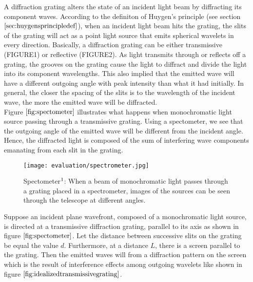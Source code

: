 A diffraction grating alters the state of an incident light beam by diffracting its component waves. According to the definiton of Huygen's principle (see section $\ref{sec:huygensprincipledef}$), when an incident light beam hits the grating, the slits of the grating will act as a point light source that emits spherical wavelets in every direction. Basically, a diffraction grating can be either transmissive (FIGURE1) or reflective (FIGURE2). As light transmits through or reflects off a grating, the grooves on the grating cause the light to diffract and divide the light into its component wavelengths. This also implied that the emitted wave will have a different outgoing angle with peak intensity than what it had initially. In general, the closer the spacing of the slits is to the wavelength of the incident wave, the more the emitted wave will be diffracted. \\

Figure $\ref{fig:spectometer}$ illustrates what happens when monochromatic light source passing through a transmissive grating. Using a spectometer, we see that the outgoing angle of the emitted wave will be different from the incident angle. Hence, the diffracted light is composed of the sum of interfering wave components emanating from each slit in the grating.

\begin{figure}[H]
  \centering
  \texttt{[image: evaluation/spectrometer.jpg]}
  \caption[Spectometer]{Spectometer$\footnotemark$: When a beam of monochromatic light passes through a grating placed in a spectrometer, images of the sources can be seen through the telescope at different angles.}
\label{fig:spectometer}
\end{figure}


Suppose an incident plane wavefront, composed of a monochromatic light source, is directed at a transmissive diffraction grating, parallel to its axis as shown in figure $\ref{fig:spectometer}$. Let the distance between successive slits on the grating be equal the value $d$. Furthermore, at a distance $L$, there is a screen parallel to the grating. Then the emitted waves will from a diffraction pattern on the screen which is the result of interference effects among outgoing wavelets like shown in figure $\ref{fig:idealizedtransmissivegrating}$. 

